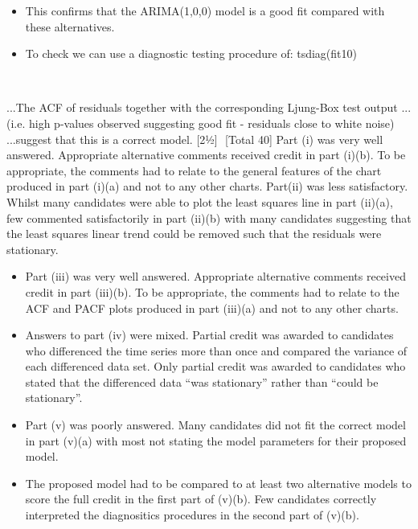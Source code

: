 \documentclass[a4paper,12pt]{article}
\begin{document}
\begin{itemize}
    \item This confirms that the ARIMA(1,0,0) model is a good fit compared with
these alternatives.

\item To check we can use a diagnostic testing procedure of:
tsdiag(fit10)
\end{itemize}

​
 
...The ACF of residuals together with the corresponding Ljung-Box test output
...(i.e. high p-values observed suggesting good fit - residuals close to white noise)
...suggest that this is a correct model.
[21⁄2]
​
[Total 40]
Part (i) was very well answered. Appropriate alternative comments received credit in part
(i)(b). To be appropriate, the comments had to relate to the general features of the chart
produced in part (i)(a) and not to any other charts.
Part(ii) was less satisfactory. Whilst many candidates were able to plot the least squares
line in part (ii)(a), few commented satisfactorily in part (ii)(b) with many candidates
suggesting that the least squares linear trend could be removed such that the residuals
were stationary.

\newpage 
 
 
 \begin{itemize}
     \item Part (iii) was very well answered. Appropriate alternative comments received credit in part (iii)(b). To be appropriate, the comments had to relate to the ACF and PACF plots
produced in part (iii)(a) and not to any other charts.
​
\item Answers to part (iv) were mixed. Partial credit was awarded to candidates who differenced the time series more than once and compared the variance of each differenced data set. Only partial credit was awarded to candidates who stated that the differenced data
“was stationary” rather than “could be stationary”.
​
\item Part (v) was poorly answered. Many candidates did not fit the correct model in part (v)(a) with most not stating the model parameters for their proposed model. 
\item The proposed model
had to be compared to at least two alternative models to score the full credit in the first part of (v)(b). Few candidates correctly interpreted the diagnositics procedures in the
second part of (v)(b).
 \end{itemize}

​
\end{document}
